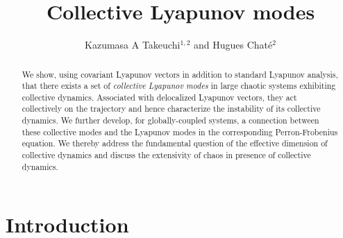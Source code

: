 \documentclass[12pt]{iopart}
\begin{document}
\newcommand{\rd}{\mathrm{d}}
\newcommand{\p}{\partial}
\newcommand{\px}{{\bi{x}}}
\newcommand{\expct}[1]{\langle #1 \rangle}
\newcommand{\Expct}[1]{\left\langle #1 \right\rangle}
\newcommand{\diff}[2]{\frac{\mathrm{d} #1}{\mathrm{d} #2}}
\newcommand{\prt}[2]{\frac{\partial #1}{\partial #2}}
\newcommand{\const}{\mathrm{const.}}
\renewcommand{\(}{\left(}
\renewcommand{\)}{\right)}
\renewcommand{\[}{\left[}
\renewcommand{\]}{\right]}
\newcommand{\im}{\mathrm{Im}}
\newcommand{\re}{\mathrm{Re}}

\title{Collective Lyapunov modes}

\author{Kazumasa A Takeuchi$^{1,2}$ and Hugues Chat\'e$^2$}

\address{$^1$ Department of Physics, the University of Tokyo,
 7-3-1 Hongo, Bunkyo-ku, Tokyo 113-0033, Japan.}
\address{$^2$ Service de Physique de l'\'Etat Condens\'e, CEA-Saclay, 91191 Gif-sur-Yvette, France.}
\begin{abstract}
We show, using covariant Lyapunov vectors in addition to
 standard Lyapunov analysis,
 that there exists a set of \textit{collective Lyapunov modes}
 in large chaotic systems exhibiting collective dynamics. 
Associated with delocalized Lyapunov vectors,
 they act collectively on the trajectory and hence characterize the
 instability of its collective dynamics. 
We further develop, for globally-coupled systems,
a connection between these collective modes and the Lyapunov modes
 in the corresponding Perron-Frobenius equation. 
We thereby address the fundamental question of the effective dimension
 of collective dynamics and discuss
the extensivity of chaos in presence of collective dynamics.
\end{abstract}

\submitto{\JPA}

\section{Introduction}
\end{document}
